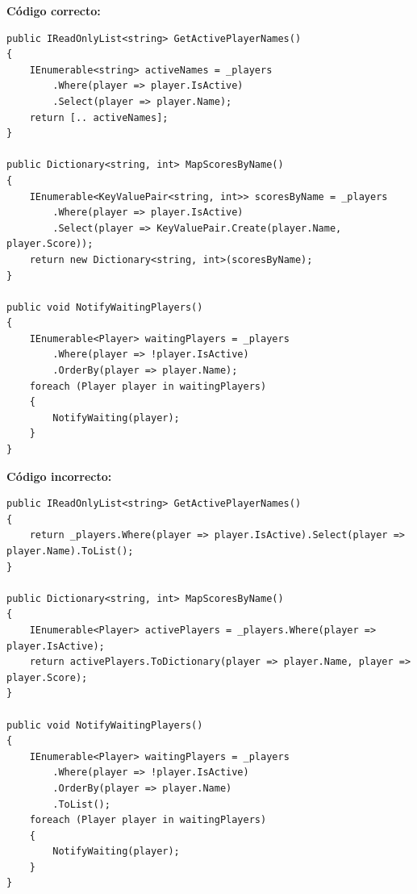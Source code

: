 \textbf{Código correcto:}
\begin{lstlisting}[style=csharpstyle,basicstyle=\ttfamily\scriptsize]
public IReadOnlyList<string> GetActivePlayerNames()
{
    IEnumerable<string> activeNames = _players
        .Where(player => player.IsActive)
        .Select(player => player.Name);
    return [.. activeNames];
}

public Dictionary<string, int> MapScoresByName()
{
    IEnumerable<KeyValuePair<string, int>> scoresByName = _players
        .Where(player => player.IsActive)
        .Select(player => KeyValuePair.Create(player.Name, player.Score));
    return new Dictionary<string, int>(scoresByName);
}

public void NotifyWaitingPlayers()
{
    IEnumerable<Player> waitingPlayers = _players
        .Where(player => !player.IsActive)
        .OrderBy(player => player.Name);
    foreach (Player player in waitingPlayers)
    {
        NotifyWaiting(player);
    }
}
\end{lstlisting}

\textbf{Código incorrecto:}
\begin{lstlisting}[style=csharpstyle,basicstyle=\ttfamily\scriptsize]
public IReadOnlyList<string> GetActivePlayerNames()
{
    return _players.Where(player => player.IsActive).Select(player => player.Name).ToList();
}

public Dictionary<string, int> MapScoresByName()
{
    IEnumerable<Player> activePlayers = _players.Where(player => player.IsActive);
    return activePlayers.ToDictionary(player => player.Name, player => player.Score);
}

public void NotifyWaitingPlayers()
{
    IEnumerable<Player> waitingPlayers = _players
        .Where(player => !player.IsActive)
        .OrderBy(player => player.Name)
        .ToList();
    foreach (Player player in waitingPlayers)
    {
        NotifyWaiting(player);
    }
}
\end{lstlisting}
